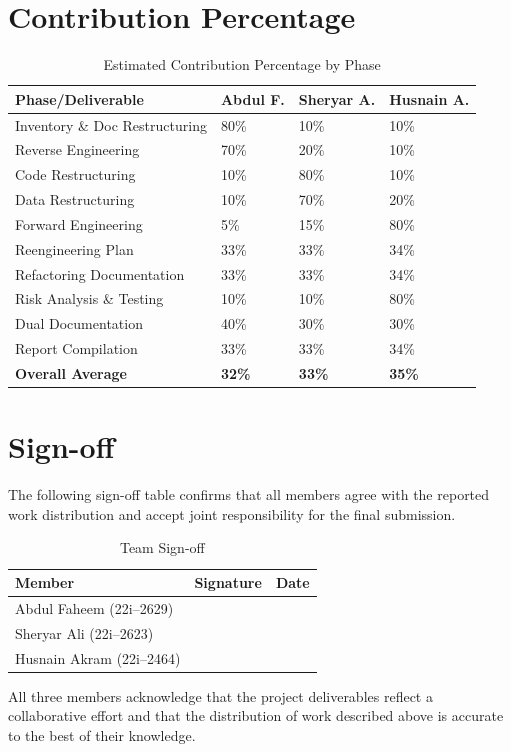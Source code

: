 \section{Contribution Percentage}

\begin{table}[h]
  \centering
  \caption{Estimated Contribution Percentage by Phase}
  \begin{tabular}{p{5cm} p{2.5cm} p{2.5cm} p{2.5cm}}
    \toprule
    \textbf{Phase/Deliverable} & \textbf{Abdul F.} & \textbf{Sheryar A.} & \textbf{Husnain A.} \\
    \midrule
    Inventory \& Doc Restructuring & 80\% & 10\% & 10\% \\
    Reverse Engineering & 70\% & 20\% & 10\% \\
    Code Restructuring & 10\% & 80\% & 10\% \\
    Data Restructuring & 10\% & 70\% & 20\% \\
    Forward Engineering & 5\% & 15\% & 80\% \\
    Reengineering Plan & 33\% & 33\% & 34\% \\
    Refactoring Documentation & 33\% & 33\% & 34\% \\
    Risk Analysis \& Testing & 10\% & 10\% & 80\% \\
    Dual Documentation & 40\% & 30\% & 30\% \\
    Report Compilation & 33\% & 33\% & 34\% \\
    \midrule
    \textbf{Overall Average} & \textbf{32\%} & \textbf{33\%} & \textbf{35\%} \\
    \bottomrule
  \end{tabular}
\end{table}

\section{Sign-off}

The following sign-off table confirms that all members agree with the
reported work distribution and accept joint responsibility for the final
submission.

\begin{table}[h]
  \centering
  \caption{Team Sign-off}
  \begin{tabular}{p{4.5cm} p{4.0cm} p{4.0cm}}
    \toprule
    \textbf{Member} & \textbf{Signature} & \textbf{Date} \\
    \midrule
    Abdul Faheem (22i--2629) & & \\[1.5em]
    Sheryar Ali (22i--2623) & & \\[1.5em]
    Husnain Akram (22i--2464) & & \\[1.5em]
    \bottomrule
  \end{tabular}
\end{table}

All three members acknowledge that the project deliverables reflect a
collaborative effort and that the distribution of work described above
is accurate to the best of their knowledge.
